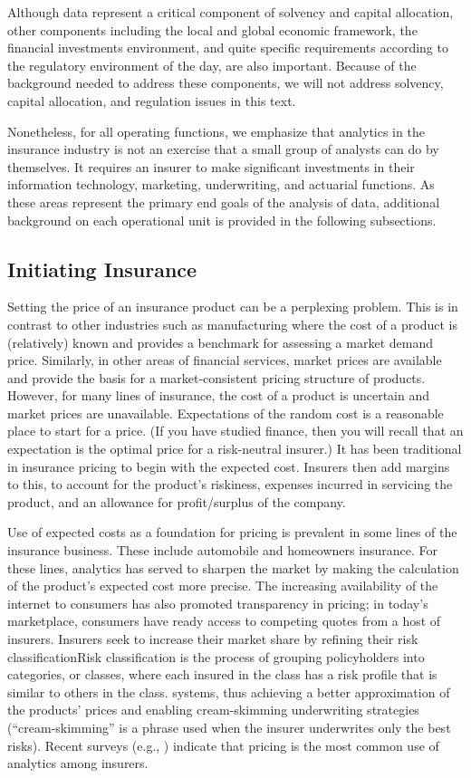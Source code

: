 \documentclass[]{book}
\theoremstyle{definition}
\theoremstyle{definition}
\theoremstyle{definition}
\theoremstyle{remark}
\begin{document}
Although data represent a critical component of solvency and capital
allocation, other components including the local and global economic
framework, the financial investments environment, and quite specific
requirements according to the regulatory environment of the day, are
also important. Because of the background needed to address these
components, we will not address solvency, capital allocation, and
regulation issues in this text.

Nonetheless, for all operating functions, we emphasize that analytics in
the insurance industry is not an exercise that a small group of analysts
can do by themselves. It requires an insurer to make significant
investments in their information technology, marketing, underwriting,
and actuarial functions. As these areas represent the primary end goals
of the analysis of data, additional background on each operational unit
is provided in the following subsections.

\subsection{Initiating Insurance}\label{initiating-insurance}

Setting the price of an insurance product can be a perplexing problem.
This is in contrast to other industries such as manufacturing where the
cost of a product is (relatively) known and provides a benchmark for
assessing a market demand price. Similarly, in other areas of financial
services, market prices are available and provide the basis for a
market-consistent pricing structure of products. However, for many lines
of insurance, the cost of a product is uncertain and market prices are
unavailable. Expectations of the random cost is a reasonable place to
start for a price. (If you have studied finance, then you will recall
that an expectation is the optimal price for a risk-neutral insurer.) It
has been traditional in insurance pricing to begin with the expected
cost. Insurers then add margins to this, to account for the product's
riskiness, expenses incurred in servicing the product, and an allowance
for profit/surplus of the company.

Use of expected costs as a foundation for pricing is prevalent in some
lines of the insurance business. These include automobile and homeowners
insurance. For these lines, analytics has served to sharpen the market
by making the calculation of the product's expected cost more precise.
The increasing availability of the internet to consumers has also
promoted transparency in pricing; in today's marketplace, consumers have
ready access to competing quotes from a host of insurers. Insurers seek
to increase their market share by refining their risk
classification{Risk classification is the process of grouping
policyholders into categories, or classes, where each insured in the
class has a risk profile that is similar to others in the class.}
systems, thus achieving a better approximation of the products' prices
and enabling cream-skimming underwriting strategies (``cream-skimming''
is a phrase used when the insurer underwrites only the best risks).
Recent surveys (e.g., \citet{survey2013}) indicate that pricing is the
most common use of analytics among insurers.
\end{document}
